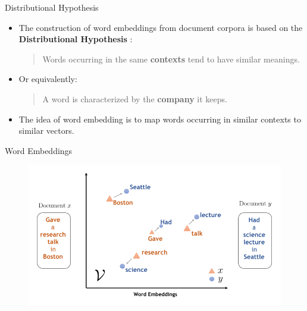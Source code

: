 \documentclass[handout]{beamer}
\begin{document}
\begin{frame}{Distributional Hypothesis}
\begin{scriptsize}
\begin{itemize}
\item The construction of word embeddings from document corpora is based on the  \textbf{Distributional Hypothesis} \cite{harris1954}: \\
\begin{quote}
 Words occurring in the same \textbf{contexts} tend to have similar meanings.
\end{quote}

\item Or equivalently:
\begin{quote}
A word is characterized by the \textbf{company} it keeps.
\end{quote}


\item The idea of word embedding is to map words occurring in similar contexts to similar vectors.

\end{itemize}
\end{scriptsize}
\end{frame}


\begin{frame}{Word Embeddings}
\begin{figure}[h]
  \includegraphics[scale=0.7]{pics/embeddings2.png}
\end{figure}



\end{frame}
\end{document}
